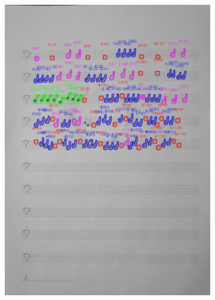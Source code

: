 \documentclass[11pt]{article}
\begin{document}
\begin{figure}[H]
    \centering
    \begin{subfigure}{.45\textwidth}
        \centering
        \graphicspath{ {blobs/} }
        \includegraphics[width=\linewidth]{17_cnts.jpg}
        \label{fig:sub1}
    \end{subfigure}%
    \begin{subfigure}{.45\textwidth}
        \centering
        \graphicspath{ {blobs/} }

\end{subfigure}
\end{figure}
\end{document}
